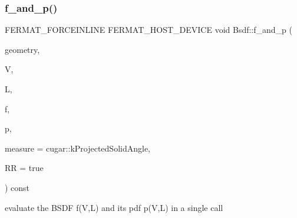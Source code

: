 \subsubsection{\texorpdfstring{f\+\_\+and\+\_\+p()}{f\_and\_p()}\hspace{0.1cm}{\footnotesize\ttfamily [1/2]}}
{\footnotesize\ttfamily F\+E\+R\+M\+A\+T\+\_\+\+F\+O\+R\+C\+E\+I\+N\+L\+I\+NE F\+E\+R\+M\+A\+T\+\_\+\+H\+O\+S\+T\+\_\+\+D\+E\+V\+I\+CE void Bsdf\+::f\+\_\+and\+\_\+p (\begin{DoxyParamCaption}\item[{const \hyperlink{structcugar_1_1_differential_geometry}{cugar\+::\+Differential\+Geometry} \&}]{geometry,  }\item[{const \hyperlink{structcugar_1_1_vector}{cugar\+::\+Vector3f}}]{V,  }\item[{const \hyperlink{structcugar_1_1_vector}{cugar\+::\+Vector3f}}]{L,  }\item[{\hyperlink{structcugar_1_1_vector}{cugar\+::\+Vector3f} $\ast$}]{f,  }\item[{float $\ast$}]{p,  }\item[{const cugar\+::\+Spherical\+Measure}]{measure = {\ttfamily cugar\+:\+:kProjectedSolidAngle},  }\item[{bool}]{RR = {\ttfamily true} }\end{DoxyParamCaption}) const\hspace{0.3cm}{\ttfamily [inline]}}

evaluate the B\+S\+DF f(\+V,\+L) and its pdf p(\+V,\+L) in a single call \mbox{\label{struct_bsdf_a67523c8158f74a07a6ed0b32b97f6bb2}} 
